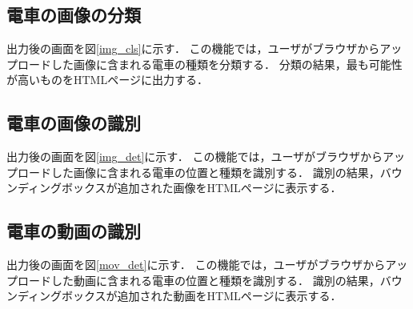 \begin{multicols*}{2}
\subsection{電車の画像の分類} 
出力後の画面を図\ref{img_cls}に示す．
この機能では，ユーザがブラウザからアップロードした画像に含まれる電車の種類を分類する． 分類の結果，最も可能性が高いものをHTMLページに出力する．
\subsection{電車の画像の識別}
出力後の画面を図\ref{img_det}に示す．
この機能では，ユーザがブラウザからアップロードした画像に含まれる電車の位置と種類を識別する．  識別の結果，バウンディングボックスが追加された画像をHTMLページに表示する．
\subsection{電車の動画の識別} 
出力後の画面を図\ref{mov_det}に示す．
この機能では，ユーザがブラウザからアップロードした動画に含まれる電車の位置と種類を識別する． 識別の結果，バウンディングボックスが追加された動画をHTMLページに表示する．



\end{multicols*}
